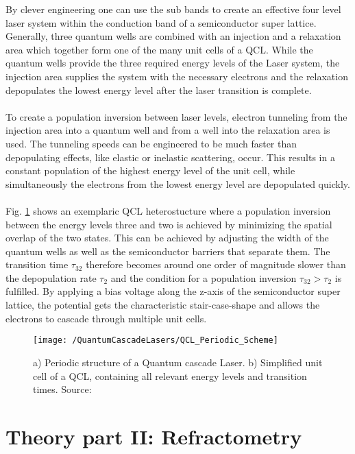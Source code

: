 \noindent  By clever engineering one can use the sub bands to create an effective four level laser system within the conduction band of a semiconductor super lattice. Generally, three quantum wells are combined with an injection and a relaxation area which together form one of the many unit cells of a QCL. While the quantum wells provide the three required energy levels of the Laser system, the injection area supplies the system with the necessary electrons and the relaxation depopulates the lowest energy level after the laser transition is complete.\\ \\ 
\noindent To create a population inversion between laser levels, electron tunneling from the injection area into a quantum well and from a well into the relaxation area is used. The tunneling speeds can be engineered to be much faster than depopulating effects, like elastic or inelastic scattering, occur. This results in a constant population of the highest energy level of the unit cell, while simultaneously the electrons from the lowest energy level are depopulated quickly.\\\\ 
Fig. \ref{figure:QCL-periodic-scheme} shows an exemplaric QCL heterostucture where a population inversion between the energy levels three and two is achieved by minimizing the spatial overlap of the two states. This can be achieved by adjusting the width of the quantum wells as well as the semiconductor barriers that separate them. The transition time $\tau_{32}$ therefore becomes around one order of magnitude slower than the depopulation rate $\tau_{2}$ and the condition for a population inversion $\tau_{32}>\tau_{2}$ is fulfilled. By applying a bias voltage along the z-axis of the semiconductor super lattice, the potential gets the characteristic stair-case-shape and allows the electrons to cascade through multiple unit cells. 
\begin{figure}[H]
	\centering
	\texttt{[image: /QuantumCascadeLasers/QCL\_Periodic\_Scheme]}
	\caption{a) Periodic structure of a Quantum cascade Laser. b) Simplified unit cell of a QCL, containing all relevant energy levels and transition times. Source: \cite{Faist2018}}
	\label{figure:QCL-periodic-scheme}
\end{figure}
\newpage
\chapter{Theory part II: Refractometry}
